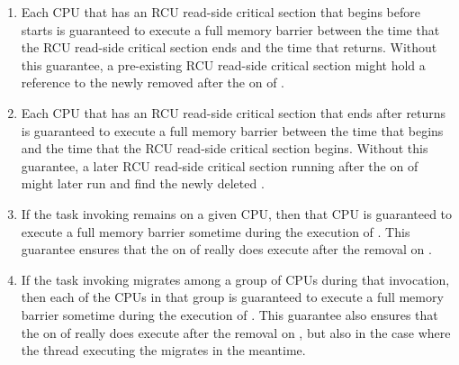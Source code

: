 \begin{fcvref}
\begin{enumerate}
\item Each CPU that has an RCU read-side critical section that begins
   before  starts is guaranteed to execute a full
   memory barrier between the time that the RCU read-side critical
   section ends and the time that  returns.
   Without
   this guarantee, a pre-existing RCU read-side critical section might
   hold a reference to the newly removed  after the
    on  %
   of .
\item Each CPU that has an RCU read-side critical section that ends after
    returns is guaranteed to execute a full memory
   barrier between the time that  begins and the
   time that the RCU read-side critical section begins.
   Without this
   guarantee, a later RCU read-side critical section running after the
    on  %
   of  might later run
    and find the newly deleted .
\item If the task invoking  remains on a given CPU,
   then that CPU is guaranteed to execute a full memory barrier sometime
   during the execution of .
   This guarantee ensures
   that the  on  %
   of  really
   does execute after the removal on . %
\item If the task invoking  migrates among a group of
   CPUs during that invocation, then each of the CPUs in that group is
   guaranteed to execute a full memory barrier sometime during the
   execution of .
   This guarantee also ensures that
   the  on  %
   of  really does
   execute after the removal on , %
   but also in the case where the
   thread executing the  migrates in the meantime.
\end{enumerate}
\end{fcvref}

